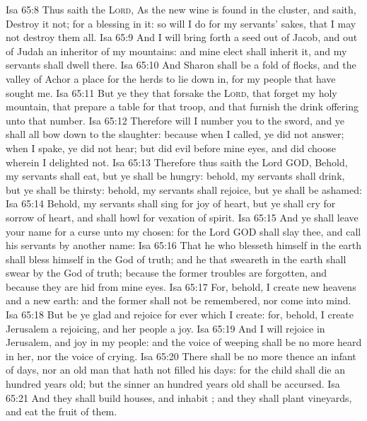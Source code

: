 \vs Isa 65:8 Thus saith the \textsc{Lord}, As the new wine is found in the cluster, and  saith, Destroy it not; for a blessing  in it: so will I do for my servants' sakes, that I may not destroy them all.
\vs Isa 65:9 And I will bring forth a seed out of Jacob, and out of Judah an inheritor of my mountains: and mine elect shall inherit it, and my servants shall dwell there.
\vs Isa 65:10 And Sharon shall be a fold of flocks, and the valley of Achor a place for the herds to lie down in, for my people that have sought me.
\vs Isa 65:11 But ye  they that forsake the \textsc{Lord}, that forget my holy mountain, that prepare a table for that troop, and that furnish the drink offering unto that number.
\vs Isa 65:12 Therefore will I number you to the sword, and ye shall all bow down to the slaughter: because when I called, ye did not answer; when I spake, ye did not hear; but did evil before mine eyes, and did choose  wherein I delighted not.
\vs Isa 65:13 Therefore thus saith the Lord GOD, Behold, my servants shall eat, but ye shall be hungry: behold, my servants shall drink, but ye shall be thirsty: behold, my servants shall rejoice, but ye shall be ashamed:
\vs Isa 65:14 Behold, my servants shall sing for joy of heart, but ye shall cry for sorrow of heart, and shall howl for vexation of spirit.
\vs Isa 65:15 And ye shall leave your name for a curse unto my chosen: for the Lord GOD shall slay thee, and call his servants by another name:
\vs Isa 65:16 That he who blesseth himself in the earth shall bless himself in the God of truth; and he that sweareth in the earth shall swear by the God of truth; because the former troubles are forgotten, and because they are hid from mine eyes.
\vs Isa 65:17 For, behold, I create new heavens and a new earth: and the former shall not be remembered, nor come into mind.
\vs Isa 65:18 But be ye glad and rejoice for ever  which I create: for, behold, I create Jerusalem a rejoicing, and her people a joy.
\vs Isa 65:19 And I will rejoice in Jerusalem, and joy in my people: and the voice of weeping shall be no more heard in her, nor the voice of crying.
\vs Isa 65:20 There shall be no more thence an infant of days, nor an old man that hath not filled his days: for the child shall die an hundred years old; but the sinner  an hundred years old shall be accursed.
\vs Isa 65:21 And they shall build houses, and inhabit ; and they shall plant vineyards, and eat the fruit of them.
